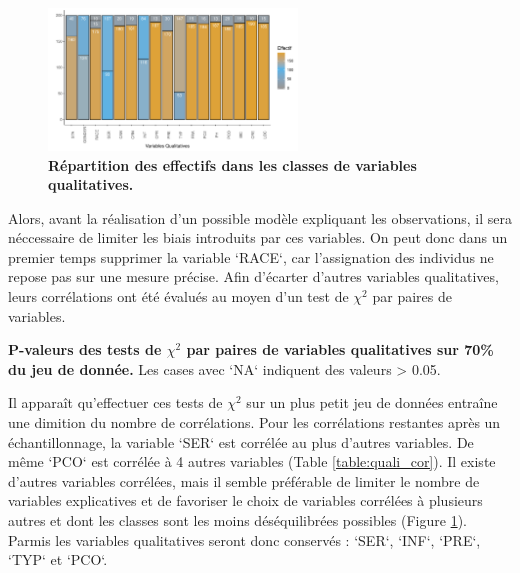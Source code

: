 \documentclass[10pt,a4paper,notitlepage,colorinlistoftodos]{article}
\begin{document}
\begin{figure}
\vspace{-20pt}
\begin{center}
\includegraphics[width=0.59\textwidth]{fig/visual.pdf}
\end{center}
\caption{\textbf{Répartition des effectifs dans les classes de variables qualitatives.} 
}
\vspace{-20pt}
\label{fig:visual}
\end{figure}

Alors, avant la réalisation d'un possible modèle expliquant les observations, il sera néccessaire de limiter les biais introduits par ces variables. On peut donc dans un premier temps supprimer la variable `RACE`, car l'assignation des individus ne repose pas sur une mesure précise. Afin d'écarter d'autres variables qualitatives, leurs corrélations ont été évalués au moyen d'un test de $\chi^2$ par paires de variables.


\begin{table}[h]
  \begin{center}
  
  \end{center}
  \caption{\textbf{P-valeurs des tests de $\chi^2$ par paires de variables qualitatives sur 70\% du jeu de donnée.} Les cases avec `NA` indiquent des valeurs > 0.05.}
  \label{table:quali_cor}
\end{table}     

Il apparaît qu'effectuer ces tests de $\chi^2$ sur un plus petit jeu de données entraîne une dimition du nombre de corrélations. Pour les corrélations restantes après un échantillonnage, la variable `SER` est corrélée au plus d'autres variables. De même `PCO` est corrélée à 4 autres variables (Table \ref{table:quali_cor}). Il existe d'autres variables corrélées, mais il semble préférable de limiter le nombre de variables explicatives et de favoriser le choix de variables corrélées à plusieurs autres et dont les classes sont les moins déséquilibrées possibles (Figure \ref{fig:visual}). Parmis les variables qualitatives seront donc conservés : `SER`, `INF`, `PRE`, `TYP` et `PCO`.
\end{document}
